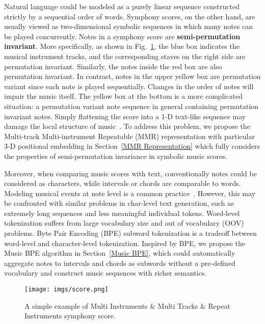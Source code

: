 \documentclass{article}
\begin{document}
Natural language could be modeled as a purely linear sequence constructed strictly by a sequential order of words. Symphony scores, on the other hand, are usually viewed as two-dimensional symbolic sequences in which many notes can be played concurrently. Notes in a symphony score are \textbf{semi-permutation invariant}. More specifically, as shown in Fig.~\ref{fig:score}, the blue box indicates the musical instrument tracks, and the corresponding staves on the right side are permutation invariant. Similarly, the notes inside the red box are also permutation invariant. In contrast, notes in the upper yellow box are permutation variant since each note is played sequentially.  Changes in the order of notes will impair the music itself. The yellow box at the bottom is a more complicated situation: a permutation variant note sequence in general containing permutation invariant notes. Simply flattening the score into a 1-D text-like sequence may damage the local structure of music~\cite{musebert}. To address this problem, we propose the Multi-track Multi-instrument Repeatable (MMR) representation with particular 3-D positional embedding in Section~\ref{MMR Representation} which fully considers the properties of semi-permutation invariance in symbolic music scores.

Moreover, when comparing music scores with text, conventionally notes could be considered as characters, while intervals or chords are comparable to words. Modeling musical events at note level is a common practice~\cite{popmt,popmag,cwt,musicbert}. However, this may be confronted with similar problems in char-level text generation, such as extremely long sequences and less meaningful individual tokens. Word-level tokenization suffers from large vocabulary size and out of vocabulary (OOV) problems. Byte Pair Encoding (BPE) \cite{bpe-nlp,bpe} subword tokenization is a tradeoff between word-level and character-level tokenization. Inspired by BPE, we propose the Music BPE algorithm in Section~\ref{Music BPE}, which could automatically aggregate notes to intervals and chords as subwords without a pre-defined vocabulary and construct music sequences with richer semantics.

\begin{figure}[t]
  \centering
  \centerline{\texttt{[image: imgs/score.png]}}
  \caption{A simple example of Multi Instruments \& Multi Tracks \& Repeat Instruments symphony score.}
  \label{fig:score}
\end{figure}
\label{para:intro-note}
\end{document}
